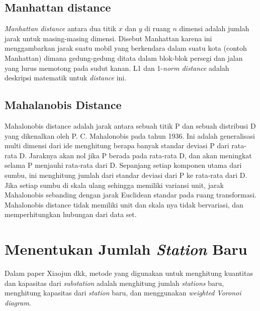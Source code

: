 \subsection{Manhattan distance}
\textit{Manhattan distance} antara dua titik $x$ dan $y$ di ruang $n$ dimensi adalah jumlah jarak untuk masing-masing dimensi. Disebut Manhattan karena ini menggambarkan jarak suatu mobil yang berkendara dalam suatu kota (contoh Manhattan) dimana gedung-gedung ditata dalam blok-blok persegi dan jalan yang lurus memotong pada sudut kanan. L1 dan 1-\textit{norm distance} adalah deskripsi matematik untuk \textit{distance} ini.

\subsection{Mahalanobis Distance} 

Mahalonobis distance adalah jarak antara sebuah titik P dan sebuah distribusi D yang dikenalkan oleh P. C. Mahalonobis pada tahun 1936. Ini adalah generalisasi multi dimensi dari ide menghitung berapa banyak standar deviasi P dari rata-rata D. Jaraknya akan nol jika P berada pada rata-rata D, dan akan meningkat selama P menjauhi rata-rata dari D. Sepanjang setiap komponen utama dari sumbu, ini menghitung jumlah dari standar deviasi dari P ke rata-rata dari D. Jika setiap sumbu di skala ulang sehingga memiliki variansi unit, jarak Mahalonobis sebanding dengan jarak Euclidean standar pada ruang transformasi. Mahalonobis distance tidak memiliki unit dan skala nya tidak bervariasi, dan memperhitungkan hubungan dari data set. \cite{mahalanobis}


\section{Menentukan Jumlah \textit{Station} Baru}\label{sec:jumlahStationBaru}

Dalam paper Xiaojun dkk, metode yang digunakan untuk menghitung kuantitas dan kapasitas dari \textit{substation} adalah menghitung jumlah \textit{stations} baru, menghitung kapasitas dari \textit{station} baru, dan menggunakan \textit{weighted Voronoi diagram}.

